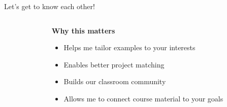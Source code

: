 \documentclass[aspectratio=169, lualatex, handout]{beamer}
\begin{document}
\begin{frame}{Let's get to know each other!}
	\begin{columns}[c]
		\begin{column}{0.5\textwidth}
		\end{column}
		\begin{column}{0.5\textwidth}
			\textbf{Why this matters}
			\begin{itemize}[<+->]
				\item Helps me tailor examples to your interests
				\item Enables better project matching
				\item Builds our classroom community
				\item Allows me to connect course material to your goals
			\end{itemize}
		\end{column}
	\end{columns}
\end{frame}

\begin{frame}[plain]
	\titlepage
\end{frame}
\end{document}
